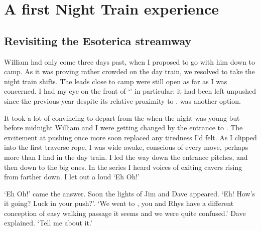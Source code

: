 \section{A first Night Train experience}

\subsection{Revisiting the Esoterica streamway}
William had only come three days past, when I proposed to go with him down to camp. As it was proving rather crowded on the day train, we resolved to take the night train shifts. The leads close to camp were still open as far as I was concerned. I had my eye on the front of `' in particular: it had been left unpushed since the previous year despite its relative proximity to .  was another option.

It took a lot of convincing to depart from the  when the night was young but before midnight William and I were getting changed by the entrance to . The excitement at pushing once more soon replaced any tiredness I'd felt. As I clipped into the first traverse rope, I was wide awake, conscious of every move, perhaps more than I had in the day train. I led the way down the entrance pitches, and then down to the big ones. In the   series I heard voices of exiting cavers rising from farther down. I let out a loud `Eh Oh!'

 `Eh Oh!' came the answer. Soon the lights of Jim and Dave appeared. `Eh! How's it going? Luck in your push?'.
`We went to , you and Rhys have a different conception of easy walking passage it seems and we were quite confused.' Dave explained.
`Tell me about it.'

